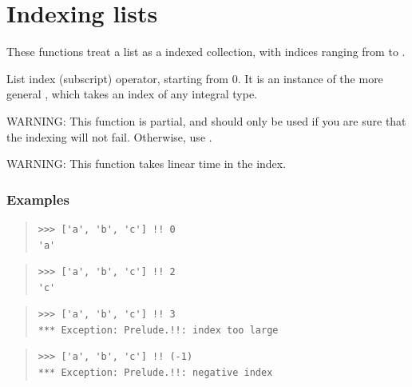 \section{Indexing lists}
These functions treat a list  as a indexed collection, with indices
 ranging from  to .\par
\begin{haddockdesc}
\item[\begin{tabular}{@{}l}
(!!) :: HasCallStack => {\char 91}a{\char 93} -> Int -> a
\end{tabular}]
{\haddockbegindoc
List index (subscript) operator, starting from 0.
 It is an instance of the more general ,
 which takes an index of any integral type.\par
WARNING: This function is partial, and should only be used if you are
 sure that the indexing will not fail. Otherwise, use .\par
WARNING: This function takes linear time in the index.\par
\subsubsection*{\textbf{Examples}}
\begin{quote}
{\haddockverb\begin{verbatim}
>>> ['a', 'b', 'c'] !! 0
'a'

\end{verbatim}}
\end{quote}
\begin{quote}
{\haddockverb\begin{verbatim}
>>> ['a', 'b', 'c'] !! 2
'c'

\end{verbatim}}
\end{quote}
\begin{quote}
{\haddockverb\begin{verbatim}
>>> ['a', 'b', 'c'] !! 3
*** Exception: Prelude.!!: index too large

\end{verbatim}}
\end{quote}
\begin{quote}
{\haddockverb\begin{verbatim}
>>> ['a', 'b', 'c'] !! (-1)
*** Exception: Prelude.!!: negative index

\end{verbatim}}
\end{quote}}
\end{haddockdesc}
